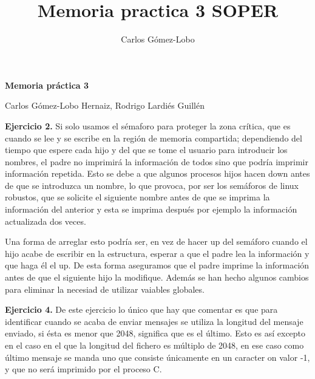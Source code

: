 \documentclass[12pt,a4paper]{article}
\begin{document}
\title{Memoria practica 3 SOPER}
\author{Carlos Gómez-Lobo}

\begin{center}
\vspace{5mm}

\textbf{\Huge Memoria práctica 3}
\vspace{5mm}

{\Large Carlos Gómez-Lobo Hernaiz, Rodrigo Lardiés Guillén}

\end{center}
\vspace{5mm}

\textbf{Ejercicio 2.} Si solo usamos el sémaforo para proteger la zona crítica, que es cuando se lee y se escribe en la región de memoria compartida; dependiendo del tiempo que espere cada hijo y del que se tome el usuario para introducir los nombres, el padre no imprimirá la información de todos sino que podría imprimir información repetida. Esto se debe a que algunos procesos hijos hacen down antes de que se introduzca un nombre, lo que provoca, por ser los semáforos de linux robustos, que se solicite el siguiente nombre antes de que se imprima la información del anterior y esta se imprima después por ejemplo la información actualizada dos veces.
\vspace{3mm}

Una forma de arreglar esto podría ser, en vez de hacer up del semáforo cuando el hijo acabe de escribir en la estructura, esperar a que el padre lea la información y que haga él el up. De esta forma aseguramos que el padre imprime la información antes de que el siguiente hijo la modifique. Además se han hecho algunos cambios para eliminar la necesiad de utilizar vaiables globales.
\vspace{5mm}

\textbf{Ejercicio 4.} De este ejercicio lo único que hay que comentar es que para identificar cuando se acaba de enviar mensajes se utiliza la longitud del mensaje enviado, si ésta es menor que 2048, significa que es el último. Esto es así excepto en el caso en el que la longitud del fichero es múltiplo de 2048, en ese caso como último mensaje se manda uno que consiste únicamente en un caracter on valor -1, y que no será imprimido por el proceso C.
\end{document}
